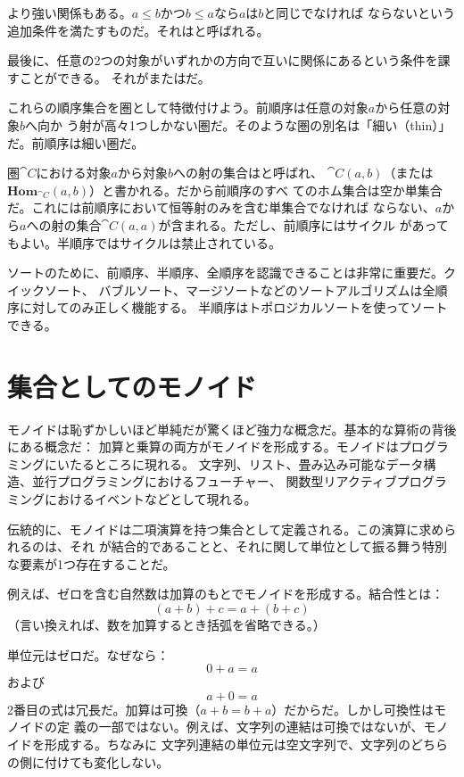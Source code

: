 より強い関係もある。$a \leqslant b$かつ$b \leqslant a$なら$a$は$b$と同じでなければ
ならないという追加条件を満たすものだ。それはと呼ばれる。

最後に、任意の2つの対象がいずれかの方向で互いに関係にあるという条件を課すことができる。
それがまたはだ。

これらの順序集合を圏として特徴付けよう。前順序は任意の対象$a$から任意の対象$b$へ向か
う射が高々1つしかない圏だ。そのような圏の別名は「細い（thin）」だ。前順序は細い圏だ。

圏$\cat{C}$における対象$a$から対象$b$への射の集合はと呼ばれ、
$\cat{C}(a, b)$（または$\mathbf{Hom}_{\cat{C}}(a, b)$）と書かれる。だから前順序のすべ
てのホム集合は空か単集合だ。これには前順序において恒等射のみを含む単集合でなければ
ならない、$a$から$a$への射の集合$\cat{C}(a, a)$が含まれる。ただし、前順序にはサイクル
があってもよい。半順序ではサイクルは禁止されている。

ソートのために、前順序、半順序、全順序を認識できることは非常に重要だ。クイックソート、
バブルソート、マージソートなどのソートアルゴリズムは全順序に対してのみ正しく機能する。
半順序はトポロジカルソートを使ってソートできる。

\section{集合としてのモノイド}

モノイドは恥ずかしいほど単純だが驚くほど強力な概念だ。基本的な算術の背後にある概念だ：
加算と乗算の両方がモノイドを形成する。モノイドはプログラミングにいたるところに現れる。
文字列、リスト、畳み込み可能なデータ構造、並行プログラミングにおけるフューチャー、
関数型リアクティブプログラミングにおけるイベントなどとして現れる。

伝統的に、モノイドは二項演算を持つ集合として定義される。この演算に求められるのは、それ
が結合的であることと、それに関して単位として振る舞う特別な要素が1つ存在することだ。

例えば、ゼロを含む自然数は加算のもとでモノイドを形成する。結合性とは：
\[(a + b) + c = a + (b + c)\]
（言い換えれば、数を加算するとき括弧を省略できる。）

単位元はゼロだ。なぜなら：
\[0 + a = a\]
および
\[a + 0 = a\]
2番目の式は冗長だ。加算は可換（$a + b = b + a$）だからだ。しかし可換性はモノイドの定
義の一部ではない。例えば、文字列の連結は可換ではないが、モノイドを形成する。ちなみに
文字列連結の単位元は空文字列で、文字列のどちらの側に付けても変化しない。

